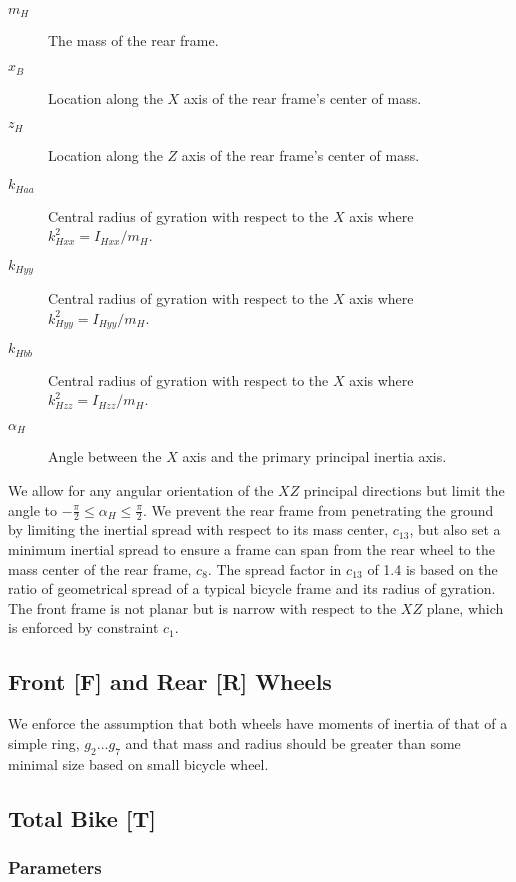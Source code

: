 \documentclass{bmd2019a}
\begin{document}
\begin{description}
  \item[$m_H$] The mass of the rear frame.
  \item[$x_B$] Location along the $X$ axis of the rear frame's center of mass.
  \item[$z_H$] Location along the $Z$ axis of the rear frame's center of mass.
  \item[$k_{Haa}$] Central radius of gyration with respect to the $X$ axis
    where $k_{Hxx}^2=I_{Hxx} / m_H$.
  \item[$k_{Hyy}$] Central radius of gyration with respect to the $X$ axis
    where $k_{Hyy}^2=I_{Hyy} / m_H$.
  \item[$k_{Hbb}$] Central radius of gyration with respect to the $X$ axis
    where $k_{Hzz}^2=I_{Hzz} / m_H$.
  \item[$\alpha_H$] Angle between the $X$ axis and the primary principal
    inertia axis.
\end{description}

We allow for any angular orientation of the $XZ$ principal directions but limit
the angle to $-\frac{\pi}{2} \leq \alpha_H \leq \frac{\pi}{2}$.  We prevent the
rear frame from penetrating the ground by limiting the inertial spread with
respect to its mass center, $c_{13}$, but also set a minimum inertial spread to
ensure a frame can span from the rear wheel to the mass center of the rear
frame, $c_8$. The spread factor in $c_{13}$ of 1.4 is based on the ratio of
geometrical spread of a typical bicycle frame and its radius of gyration. The
front frame is not planar but is narrow with respect to the $XZ$ plane, which
is enforced by constraint $c_1$.

\subsection{Front [F] and Rear [R] Wheels}

We enforce the assumption that both wheels have moments of inertia of that of a
simple ring, $g_2 \ldots g_7$ and that mass and radius should be greater than
some minimal size based on small bicycle wheel.

\subsection{Total Bike [T]}

\subsubsection{Parameters}
\end{document}
